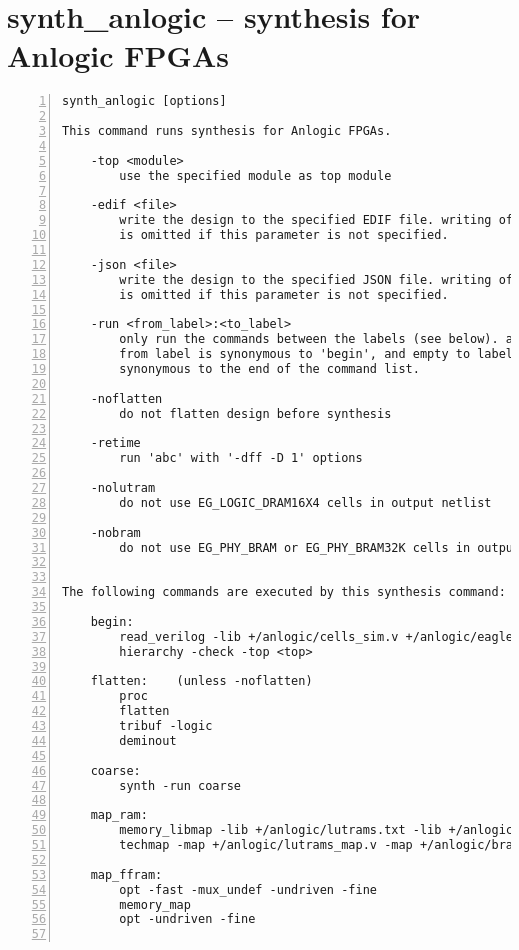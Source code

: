 \section{synth\_anlogic -- synthesis for Anlogic FPGAs}
\label{cmd:synth_anlogic}
\begin{lstlisting}[numbers=left,frame=single]
    synth_anlogic [options]

This command runs synthesis for Anlogic FPGAs.

    -top <module>
        use the specified module as top module

    -edif <file>
        write the design to the specified EDIF file. writing of an output file
        is omitted if this parameter is not specified.

    -json <file>
        write the design to the specified JSON file. writing of an output file
        is omitted if this parameter is not specified.

    -run <from_label>:<to_label>
        only run the commands between the labels (see below). an empty
        from label is synonymous to 'begin', and empty to label is
        synonymous to the end of the command list.

    -noflatten
        do not flatten design before synthesis

    -retime
        run 'abc' with '-dff -D 1' options

    -nolutram
        do not use EG_LOGIC_DRAM16X4 cells in output netlist

    -nobram
        do not use EG_PHY_BRAM or EG_PHY_BRAM32K cells in output netlist


The following commands are executed by this synthesis command:

    begin:
        read_verilog -lib +/anlogic/cells_sim.v +/anlogic/eagle_bb.v
        hierarchy -check -top <top>

    flatten:    (unless -noflatten)
        proc
        flatten
        tribuf -logic
        deminout

    coarse:
        synth -run coarse

    map_ram:
        memory_libmap -lib +/anlogic/lutrams.txt -lib +/anlogic/brams.txt [-no-auto-block] [-no-auto-distributed]    (-no-auto-block if -nobram, -no-auto-distributed if -nolutram)
        techmap -map +/anlogic/lutrams_map.v -map +/anlogic/brams_map.v

    map_ffram:
        opt -fast -mux_undef -undriven -fine
        memory_map
        opt -undriven -fine


\end{lstlisting}
